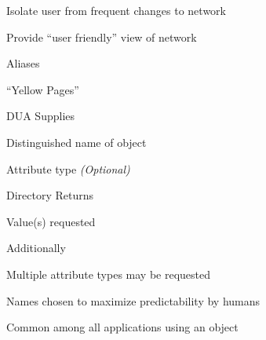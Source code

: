 \begin{bwslide}

\begin{nrtc}
\item	Isolate user from frequent changes to network
\item	Provide ``user friendly'' view of network
	\begin{nrtc}
	\item	Aliases
	\item	``Yellow Pages''
	\end{nrtc}
\end{nrtc}
\end{bwslide}

\begin{bwslide}
\end{bwslide}

\begin{bwslide}

\begin{nrtc}
\item	DUA Supplies
	\begin{nrtc}
	\item	Distinguished name of object
	\item	Attribute type {\em (Optional)}
	\end{nrtc}
\item	Directory Returns
	\begin{nrtc}
	\item	Value(s) requested
	\end{nrtc}
\item	Additionally
	\begin{nrtc}
	\item Multiple attribute types may be requested
	\end{nrtc}
\end{nrtc}
\end{bwslide}

\begin{bwslide}

\begin{nrtc}
\item	Names chosen to maximize predictability by humans
\item	Common among all applications using an object
\end{nrtc}
\end{bwslide}

